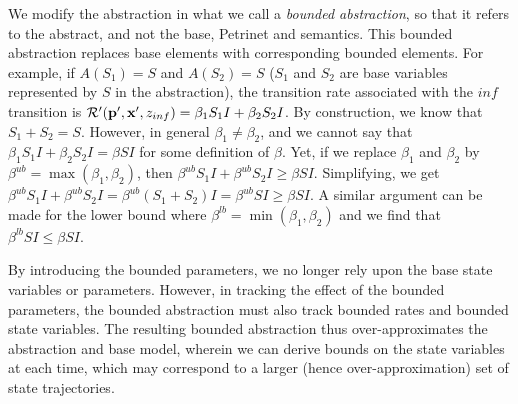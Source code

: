 We modify the abstraction in what we call a \emph{bounded abstraction}, so that
it refers to the abstract, and not the base, Petrinet and semantics.  This
bounded abstraction replaces base elements with corresponding bounded elements.
For example, if $A(S_1) = S$ and $A(S_2) = S$ ($S_1$ and $S_2$ are base
variables represented by $S$ in the abstraction), the transition rate associated with the $inf$ transition is
 ${\cal R}'({\bf p}', {\bf x}', z_{inf}) = \beta_1 S_1 I +  \beta_2 S_2 I$.
By construction, we know that $S_1 + S_2 = S$.  However, in general $\beta_1 \not=
\beta_2$, and we cannot say that $\beta_1 S_1 I + \beta_2 S_2 I = \beta S I$ for some definition of $\beta$.  Yet, if
we replace $\beta_1$ and $\beta_2$ by $\beta^{ub} = \max(\beta_1, \beta_2)$, then $\beta^{ub} S_1 I +
\beta^{ub} S_2 I \geq \beta S I$.  Simplifying, we get $\beta^{ub} S_1 I + \beta^{ub} S_2 I =
\beta^{ub}(S_1 + S_2)I = \beta^{ub} S I \geq \beta S I$.  A similar argument can be made for the lower bound where
$\beta^{lb} = \min(\beta_1, \beta_2)$ and we find that $\beta^{lb} S I \leq \beta S I$.  

By introducing the bounded parameters, we no longer rely upon the base state
variables or parameters.  However, in tracking the effect of the bounded
parameters, the bounded abstraction must also track bounded rates and bounded
state variables.  The resulting bounded abstraction thus over-approximates the
abstraction and base model, wherein we can derive bounds on the state variables
at each time, which may correspond to a larger (hence over-approximation) set of
state trajectories.

